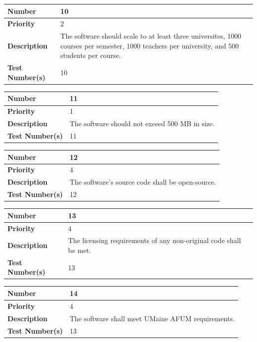 \documentclass{article}
\begin{document}
\begin{center}
\bigskip
{}
\begin{tabular}{|p{3.5cm}|p{7.5cm}|} 
\hline
\textbf{Number} & 10  \\
\hline
\textbf{Priority} & 2\\ 
\hline
\textbf{Description} & The software should scale to at least three universites, 1000 courses per semester, 1000 teachers per university, and 500 students per course. \\ 
\hline
\textbf{Test Number(s) }& 10 \\ 
\hline
\end{tabular}


\bigskip
{}
\begin{tabular}{|p{3.5cm}|p{7.5cm}|} 
\hline
\textbf{Number} & 11  \\
\hline
\textbf{Priority} & 1 \\ 
\hline
\textbf{Description} & The software should not exceed 500 MB in size. \\ 
\hline
\textbf{Test Number(s) }& 11 \\ 
\hline
\end{tabular}


\bigskip
{}
\begin{tabular}{|p{3.5cm}|p{7.5cm}|} 
\hline
\textbf{Number} & 12  \\
\hline
\textbf{Priority} & 4\\ 
\hline
\textbf{Description} & The software's source code shall be open-source. \\ 
\hline
\textbf{Test Number(s) }& 12\\ 
\hline
\end{tabular}


\bigskip
{}
\begin{tabular}{|p{3.5cm}|p{7.5cm}|} 
\hline
\textbf{Number} & 13  \\
\hline
\textbf{Priority} & 4 \\ 
\hline
\textbf{Description} & The licensing requirements of any non-original code shall be met.\\ 
\hline
\textbf{Test Number(s) }& 13 \\ 
\hline
\end{tabular}

\bigskip
{}
\begin{tabular}{|p{3.5cm}|p{7.5cm}|} 
\hline
\textbf{Number} & 14  \\
\hline
\textbf{Priority} & 4 \\ 
\hline
\textbf{Description} & The software shall meet UMaine AFUM requirements.\\ 
\hline
\textbf{Test Number(s) }& 13 \\ 
\hline
\end{tabular}

\end{center}
\end{document}
